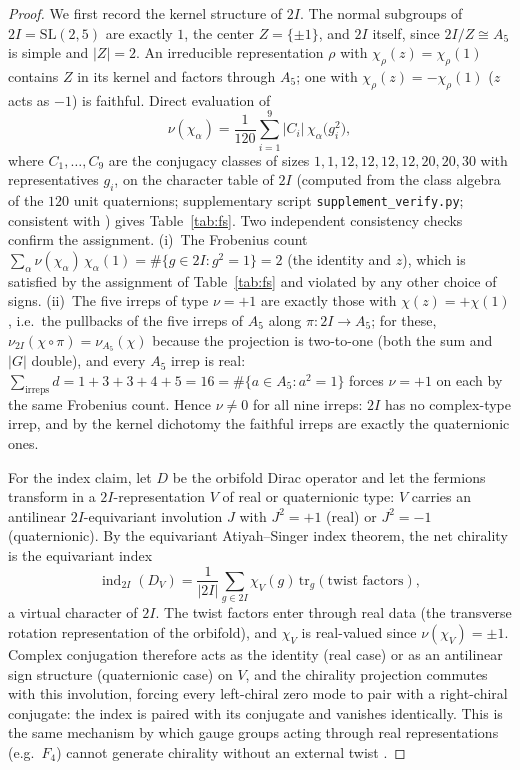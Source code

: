 \documentclass[11pt,a4paper]{amsart}
\theoremstyle{definition}
\theoremstyle{remark}
\newcommand{\SL}{\mathrm{SL}}
\begin{document}
\begin{proof}
We first record the kernel structure of $2I$. The normal subgroups of
$2I = \SL(2,5)$ are exactly $1$, the center $Z = \{\pm 1\}$, and $2I$
itself, since $2I/Z \cong A_5$ is simple and $|Z| = 2$. An irreducible
representation $\rho$ with $\chi_\rho(z) = \chi_\rho(1)$ contains $Z$ in
its kernel and factors through $A_5$; one with $\chi_\rho(z) =
-\chi_\rho(1)$ ($z$ acts as $-1$) is faithful. Direct evaluation of
\[ \nu(\chi_\alpha) = \frac{1}{120} \sum_{i=1}^{9} |C_i|\,
   \chi_\alpha\!\bigl(g_i^2\bigr), \]
where $C_1, \dots, C_9$ are the conjugacy classes of sizes
$1, 1, 12, 12, 12, 12, 20, 20, 30$ with representatives $g_i$, on the
character table of $2I$ (computed from the class algebra of the $120$ unit
quaternions; supplementary script \texttt{supplement\_verify.py}; consistent
with \cite{ATLAS1985}) gives Table~\ref{tab:fs}. Two independent consistency
checks confirm the assignment. (i)~The Frobenius count
$\sum_\alpha \nu(\chi_\alpha)\, \chi_\alpha(1) = \#\{g \in 2I : g^2 = 1\}
= 2$ (the identity and $z$), which is satisfied by the assignment of
Table~\ref{tab:fs} and violated by any other choice of signs. (ii)~The five
irreps of type $\nu = +1$ are exactly those with $\chi(z) = +\chi(1)$, i.e.\
the pullbacks of the five irreps of $A_5$ along $\pi: 2I \to A_5$; for these,
$\nu_{2I}(\chi \circ \pi) = \nu_{A_5}(\chi)$ because the projection is
two-to-one (both the sum and $|G|$ double), and every $A_5$ irrep is real:
$\sum_{\text{irreps}} d = 1 + 3 + 3 + 4 + 5 = 16 = \#\{a \in A_5 : a^2 =
1\}$ forces $\nu = +1$ on each by the same Frobenius count. Hence $\nu \ne
0$ for all nine irreps: $2I$ has no complex-type irrep, and by the kernel
dichotomy the faithful irreps are exactly the quaternionic ones.

For the index claim, let $D$ be the orbifold Dirac operator and let the
fermions transform in a $2I$-representation $V$ of real or quaternionic
type: $V$ carries an antilinear $2I$-equivariant involution $J$ with $J^2 =
+1$ (real) or $J^2 = -1$ (quaternionic). By the equivariant
Atiyah--Singer index theorem, the net chirality is the equivariant index
\[ \operatorname{ind}_{2I}(D_V) = \frac{1}{|2I|}
   \sum_{g \in 2I} \chi_V(g)\, \mathrm{tr}_g(\text{twist factors}), \]
a virtual character of $2I$. The twist factors enter through real data
(the transverse rotation representation of the orbifold), and $\chi_V$ is
real-valued since $\nu(\chi_V) = \pm 1$. Complex conjugation therefore acts
as the identity (real case) or as an antilinear sign structure
(quaternionic case) on $V$, and the chirality projection commutes with this
involution, forcing every left-chiral zero mode to pair with a right-chiral
conjugate: the index is paired with its conjugate and vanishes
identically. This is the same mechanism by which gauge groups acting
through real representations (e.g.\ $F_4$) cannot generate chirality
without an external twist \cite{Vafa1986, Polchinski1998}.


\end{proof}
\end{document}
